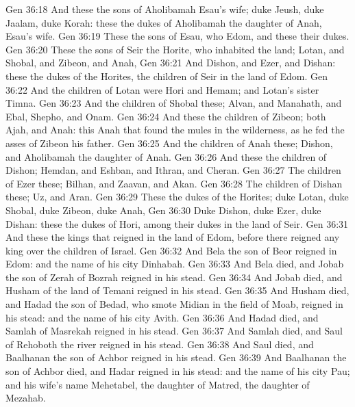 \vs Gen 36:18 And these  the sons of Aholibamah Esau's wife; duke Jeush, duke Jaalam, duke Korah: these  the dukes  of Aholibamah the daughter of Anah, Esau's wife.
\vs Gen 36:19 These  the sons of Esau, who  Edom, and these  their dukes.
\vs Gen 36:20 These  the sons of Seir the Horite, who inhabited the land; Lotan, and Shobal, and Zibeon, and Anah,
\vs Gen 36:21 And Dishon, and Ezer, and Dishan: these  the dukes of the Horites, the children of Seir in the land of Edom.
\vs Gen 36:22 And the children of Lotan were Hori and Hemam; and Lotan's sister  Timna.
\vs Gen 36:23 And the children of Shobal  these; Alvan, and Manahath, and Ebal, Shepho, and Onam.
\vs Gen 36:24 And these  the children of Zibeon; both Ajah, and Anah: this  Anah that found the mules in the wilderness, as he fed the asses of Zibeon his father.
\vs Gen 36:25 And the children of Anah  these; Dishon, and Aholibamah the daughter of Anah.
\vs Gen 36:26 And these  the children of Dishon; Hemdan, and Eshban, and Ithran, and Cheran.
\vs Gen 36:27 The children of Ezer  these; Bilhan, and Zaavan, and Akan.
\vs Gen 36:28 The children of Dishan  these; Uz, and Aran.
\vs Gen 36:29 These  the dukes  of the Horites; duke Lotan, duke Shobal, duke Zibeon, duke Anah,
\vs Gen 36:30 Duke Dishon, duke Ezer, duke Dishan: these  the dukes  of Hori, among their dukes in the land of Seir.
\vs Gen 36:31 And these  the kings that reigned in the land of Edom, before there reigned any king over the children of Israel.
\vs Gen 36:32 And Bela the son of Beor reigned in Edom: and the name of his city  Dinhabah.
\vs Gen 36:33 And Bela died, and Jobab the son of Zerah of Bozrah reigned in his stead.
\vs Gen 36:34 And Jobab died, and Husham of the land of Temani reigned in his stead.
\vs Gen 36:35 And Husham died, and Hadad the son of Bedad, who smote Midian in the field of Moab, reigned in his stead: and the name of his city  Avith.
\vs Gen 36:36 And Hadad died, and Samlah of Masrekah reigned in his stead.
\vs Gen 36:37 And Samlah died, and Saul of Rehoboth  the river reigned in his stead.
\vs Gen 36:38 And Saul died, and Baalhanan the son of Achbor reigned in his stead.
\vs Gen 36:39 And Baalhanan the son of Achbor died, and Hadar reigned in his stead: and the name of his city  Pau; and his wife's name  Mehetabel, the daughter of Matred, the daughter of Mezahab.
